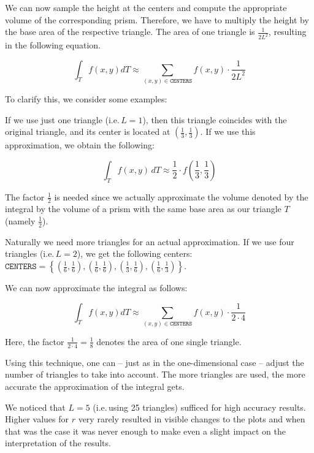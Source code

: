 \documentclass[a4paper, twoside]{article}
\begin{document}
We can now sample the height at the centers and compute the appropriate volume of the corresponding prism. Therefore, we have to multiply the height by the base area of the respective triangle. The area of one triangle is $\frac{1}{2 L^2}$, resulting in the following equation.

\begin{equation}
  \int_T f(x,y) dT \approx \sum_{(x,y)\in\mathtt{CENTERS}} f(x,y) \cdot \frac{1}{2L^2}
\end{equation}

To clarify this, we consider some examples:

If we use just one triangle (i.e.\,$L=1$), then this triangle coincides with the original triangle, and its center is located at $(\frac{1}{3}, \frac{1}{3})$. If we use this approximation, we obtain the following:

\begin{equation*}
  \int_T f(x,y)\, dT \approx \frac{1}{2} \cdot f(\frac{1}{3},\frac{1}{3})
\end{equation*}

The factor $\frac{1}{2}$ is needed since we actually approximate the volume denoted by the integral by the volume of a prism with the same base area as our triangle $T$ (namely $\frac{1}{2}$).

Naturally we need more triangles for an actual approximation. If we use four triangles (i.e.\,$L=2$), we get the following centers: $\mathtt{CENTERS} = \left\{ (\frac{1}{6}, \frac{1}{6}), (\frac{1}{6}, \frac{1}{6}), (\frac{1}{3}, \frac{1}{6}), (\frac{1}{6},\frac{1}{3}) \right\}$.

We can now approximate the integral as follows:

\begin{equation*}
  \int_T f(x,y) dT \approx \sum_{(x,y)\in\mathtt{CENTERS}} f(x,y)\cdot \frac{1}{2\cdot 4}
\end{equation*}

Here, the factor $\frac{1}{2\cdot 4} = \frac{1}{8}$ denotes the area of one single triangle.

Using this technique, one can -- just as in the one-dimensional case -- adjust the number of triangles to take into account. The more triangles are used, the more accurate the approximation of the integral gets.

We noticed that $L=5$ (i.e.\,using 25 triangles) sufficed for high accuracy results. Higher values for $r$ very rarely resulted in visible changes to the plots and when that was the case it was never enough to make even a slight impact on the interpretation of the results.
\end{document}
